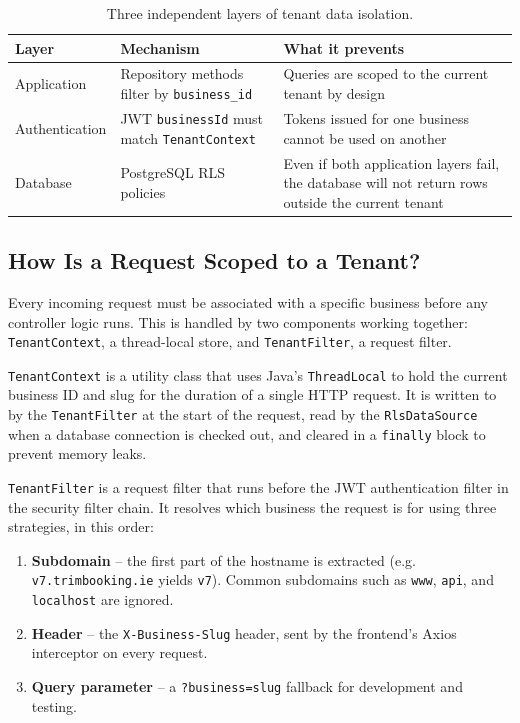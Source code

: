 \begin{table}[H]
    \centering
    \begin{tabular}{|p{}|p{}|p{}|}
    \hline
    \textbf{Layer} & \textbf{Mechanism} & \textbf{What it prevents} \\
    \hline
    Application & Repository methods filter by \texttt{business\_id} & Queries are scoped to the current tenant by design \\
    \hline
    Authentication & JWT \texttt{businessId} must match \texttt{TenantContext} & Tokens issued for one business cannot be used on another \\
    \hline
    Database & PostgreSQL RLS policies & Even if both application layers fail, the database will not return rows outside the current tenant \\
    \hline
    \end{tabular}
    \caption{Three independent layers of tenant data isolation.}
    \label{tab:isolation-layers}
\end{table}

\subsection*{How Is a Request Scoped to a Tenant?}
Every incoming request must be associated with a specific business before any controller logic runs. This is handled by two components working together: \texttt{TenantContext}, a thread-local store, and \texttt{TenantFilter}, a request filter.

\texttt{TenantContext} is a utility class that uses Java's \texttt{ThreadLocal} to hold the current business ID and slug for the duration of a single HTTP request. It is written to by the \texttt{TenantFilter} at the start of the request, read by the \texttt{RlsDataSource} when a database connection is checked out, and cleared in a \texttt{finally} block to prevent memory leaks.

\texttt{TenantFilter} is a request filter that runs before the JWT authentication filter in the security filter chain. It resolves which business the request is for using three strategies, in this order:

\begin{enumerate}
    \item \textbf{Subdomain} -- the first part of the hostname is extracted (e.g. \texttt{v7.trimbooking.ie} yields \texttt{v7}). Common subdomains such as \texttt{www}, \texttt{api}, and \texttt{localhost} are ignored.
    \item \textbf{Header} -- the \texttt{X-Business-Slug} header, sent by the frontend's Axios interceptor on every request.
    \item \textbf{Query parameter} -- a \texttt{?business=slug} fallback for development and testing.
\end{enumerate}

